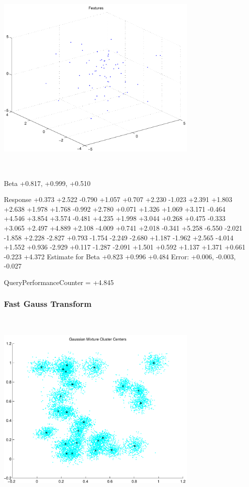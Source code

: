 \documentclass[9pt]{article}
\theoremstyle{plain}
\theoremstyle{definition}
\theoremstyle{remark}
\numberwithin{equation}{section}
\begin{document}
\includegraphics[width=10.0cm,height=10.0cm]{regression_features.pdf}

Beta
+0.817, +0.999, +0.510

Response
+0.373
+2.522
-0.790
+1.057
+0.707
+2.230
-1.023
+2.391
+1.803
+2.638
+1.978
+1.768
-0.992
+2.780
+0.071
+1.326
+1.069
+3.171
-0.464
+4.546
+3.854
+3.574
-0.481
+4.235
+1.998
+3.044
+0.268
+0.475
-0.333
+3.065
+2.497
+4.889
+2.108
-4.009
+0.741
+2.018
-0.341
+5.258
-6.550
-2.021
-1.858
+2.228
-2.827
+0.793
-1.754
-2.249
-2.680
+1.187
-1.962
+2.565
-4.014
+1.552
+0.936
-2.929
+0.117
-1.287
-2.091
+1.501
+0.592
+1.137
+1.371
+0.661
-0.223
+4.372
Estimate for Beta
+0.823
+0.996
+0.484
Error:
+0.006, -0.003, -0.027


QueryPerformanceCounter  =  +4.845
\subsubsection{Fast Gauss Transform}
\includegraphics[width=10.0cm,height=10.0cm]{GaussianMixture_ClusterCenters25_Centers.pdf}
\end{document}
